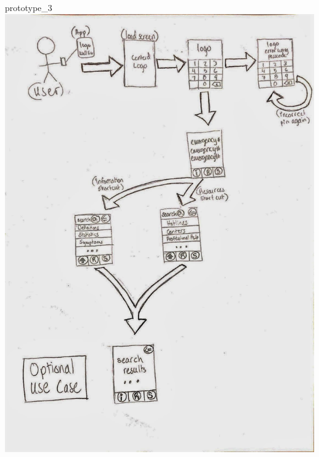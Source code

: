\documentclass[letterpaper,12pt,titlepage]{article}
\begin{document}
{prototype_3}
\newpage
\hspace*{-.2in}
\includegraphics[scale=.44]
{prototype_optional}
\newpage
\end{document}
